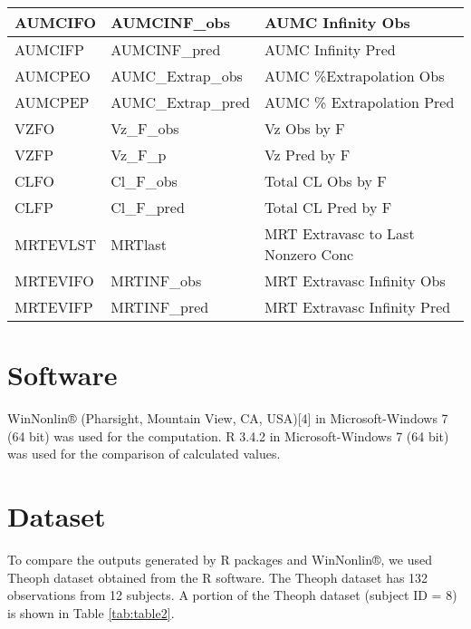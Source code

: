 \documentclass[12pt,]{krantz}
\theoremstyle{definition}
\theoremstyle{definition}
\theoremstyle{definition}
\theoremstyle{remark}
\begin{document}
\begin{table}
\begin{tabular}[t]{l|l|l}
\hline
AUMCIFO & AUMCINF\_obs & AUMC Infinity Obs\\
\hline
AUMCIFP & AUMCINF\_pred & AUMC Infinity Pred\\
\hline
AUMCPEO & AUMC\_Extrap\_obs & AUMC \%Extrapolation Obs\\
\hline
AUMCPEP & AUMC\_Extrap\_pred & AUMC \% Extrapolation Pred\\
\hline
VZFO & Vz\_F\_obs & Vz Obs by F\\
\hline
VZFP & Vz\_F\_p & Vz Pred by F\\
\hline
CLFO & Cl\_F\_obs & Total CL Obs by F\\
\hline
CLFP & Cl\_F\_pred & Total CL Pred by F\\
\hline
MRTEVLST & MRTlast & MRT Extravasc to Last Nonzero Conc\\
\hline
MRTEVIFO & MRTINF\_obs & MRT Extravasc Infinity Obs\\
\hline
MRTEVIFP & MRTINF\_pred & MRT Extravasc Infinity Pred\\
\hline
\end{tabular}
\end{table}

\section{Software}\label{software}

WinNonlin® (Pharsight, Mountain View, CA, USA){[}4{]} in
Microsoft-Windows 7 (64 bit) was used for the computation. R 3.4.2 in
Microsoft-Windows 7 (64 bit) was used for the comparison of calculated
values.

\section{Dataset}\label{dataset}

To compare the outputs generated by R packages and WinNonlin®, we used
Theoph dataset obtained from the R software. The Theoph dataset has 132
observations from 12 subjects. A portion of the Theoph dataset (subject
ID = 8) is shown in Table \ref{tab:table2}.
\end{document}
